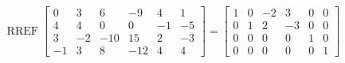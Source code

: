 \begin{exerciseAnswer} 


\[\operatorname{RREF} \left[\begin{array}{cccccc}
0 & 3 & 6 & -9 & 4 & 1 \\
4 & 4 & 0 & 0 & -1 & -5 \\
3 & -2 & -10 & 15 & 2 & -3 \\
-1 & 3 & 8 & -12 & 4 & 4
\end{array}\right] = \left[\begin{array}{cccccc}
1 & 0 & -2 & 3 & 0 & 0 \\
0 & 1 & 2 & -3 & 0 & 0 \\
0 & 0 & 0 & 0 & 1 & 0 \\
0 & 0 & 0 & 0 & 0 & 1
\end{array}\right] \]



\end{exerciseAnswer}
